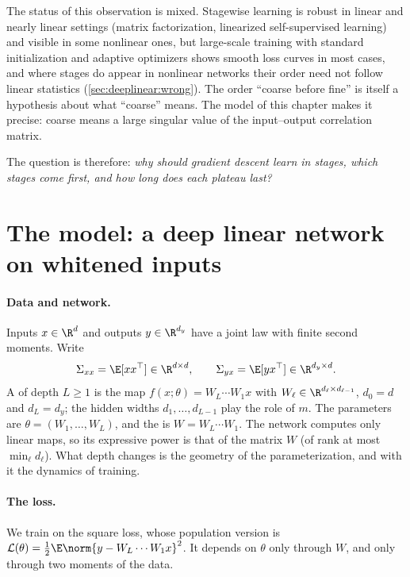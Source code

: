 \begin{refsection}
The status of this observation is mixed. Stagewise learning is robust in linear and nearly linear settings (matrix factorization, linearized self-supervised learning) and visible in some nonlinear ones, but large-scale training with standard initialization and adaptive optimizers shows smooth loss curves in most cases, and where stages do appear in nonlinear networks their order need not follow linear statistics (\cref{sec:deeplinear:wrong}). The order ``coarse before fine'' is itself a hypothesis about what ``coarse'' means. The model of this chapter makes it precise: coarse means a large singular value of the input--output correlation matrix.

The question is therefore: \emph{why should gradient descent learn in stages, which stages come first, and how long does each plateau last?}

\section{The model: a deep linear network on whitened inputs}\label{sec:deeplinear:model}

\paragraph{Data and network.} Inputs $x\in\R^d$ and outputs $y\in\R^{d_y}$ have a joint law with finite second moments. Write
\[
  \Sigma_{xx}=\E[xx^\top]\in\R^{d\times d},\qquad \dlS=\E[yx^\top]\in\R^{d_y\times d}.
\]
A  of depth $L\ge1$ is the map $f(x;\theta)=W_L\cdots W_1x$ with $W_\ell\in\R^{d_\ell\times d_{\ell-1}}$, $d_0=d$ and $d_L=d_y$; the hidden widths $d_1,\dots,d_{L-1}$ play the role of $m$. The parameters are $\theta=(W_1,\dots,W_L)$, and the  is $W=W_L\cdots W_1$. The network computes only linear maps, so its expressive power is that of the matrix $W$ (of rank at most $\min_\ell d_\ell$). What depth changes is the geometry of the parameterization, and with it the dynamics of training.


\paragraph{The loss.} We train on the square loss, whose population version is $\Loss(\theta)=\frac12\E\norm{y-W_L\cdots W_1x}^2$. It depends on $\theta$ only through $W$, and only through two moments of the data.


\end{refsection}
